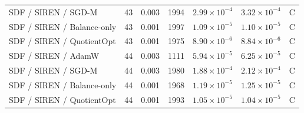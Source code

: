\begin{longtable}{p{.31\linewidth}rrrrrr}
SDF / SIREN / SGD-M & 43 & 0.003 & 1994 & $2.99\!\times\!10^{-4}$ & $3.32\!\times\!10^{-4}$ & C\\
SDF / SIREN / Balance-only & 43 & 0.001 & 1997 & $1.09\!\times\!10^{-5}$ & $1.10\!\times\!10^{-5}$ & C\\
\rowcolor{oursbg}SDF / SIREN / QuotientOpt & 43 & 0.001 & 1975 & $8.90\!\times\!10^{-6}$ & $8.84\!\times\!10^{-6}$ & C\\
SDF / SIREN / AdamW & 44 & 0.003 & 1111 & $5.94\!\times\!10^{-5}$ & $6.25\!\times\!10^{-5}$ & C\\
SDF / SIREN / SGD-M & 44 & 0.003 & 1980 & $1.88\!\times\!10^{-4}$ & $2.12\!\times\!10^{-4}$ & C\\
SDF / SIREN / Balance-only & 44 & 0.001 & 1968 & $1.19\!\times\!10^{-5}$ & $1.25\!\times\!10^{-5}$ & C\\
\rowcolor{oursbg}SDF / SIREN / QuotientOpt & 44 & 0.001 & 1993 & $1.05\!\times\!10^{-5}$ & $1.04\!\times\!10^{-5}$ & C\\
\bottomrule
\end{longtable}
\endgroup
